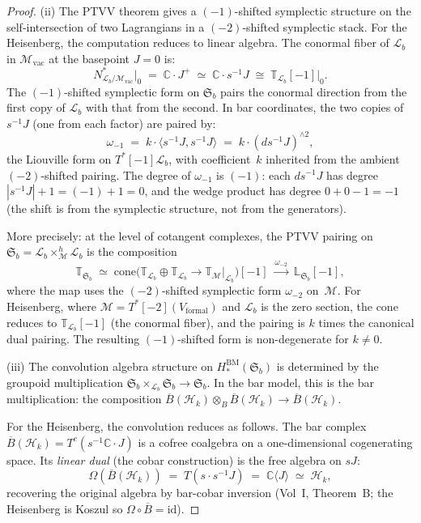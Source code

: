 \documentclass[11pt]{article}
\newcommand{\cM}{\mathcal{M}}
\newcommand{\cH}{\mathcal{H}}
\newcommand{\cL}{\mathcal{L}}
\newcommand{\barB}{\overline{B}}
\newcommand{\C}{\mathbb{C}}
\newcommand{\id}{\mathrm{id}}
\begin{document}
\begin{proof}
(ii)\enspace
The PTVV theorem gives a $(-1)$-shifted symplectic structure on the
self-intersection of two Lagrangians in a $(-2)$-shifted symplectic
stack.  For the Heisenberg, the computation reduces to linear
algebra.  The conormal fiber of $\cL_b$ in $\cM_{\mathrm{vac}}$ at
the basepoint $J = 0$ is:
\[
N^*_{\cL_b/\cM_{\mathrm{vac}}} \big|_0
\;=\;
\C \cdot J^+
\;\simeq\;
\C \cdot s^{-1}J
\;\cong\;
\mathbb{T}_{\cL_b}[-1]\big|_0.
\]
The $(-1)$-shifted symplectic form on $\mathfrak{S}_b$ pairs
the conormal direction from the first copy of $\cL_b$ with that
from the second.  In bar coordinates, the two copies of $s^{-1}J$
(one from each factor) are paired by:
\[
\omega_{-1}
\;=\;
k \cdot \langle s^{-1}J, s^{-1}J \rangle
\;=\;
k \cdot (ds^{-1}J)^{\wedge 2},
\]
the Liouville form on $T^*[-1]\cL_b$, with coefficient~$k$ inherited
from the ambient $(-2)$-shifted pairing.  The degree of
$\omega_{-1}$ is $(-1)$: each $ds^{-1}J$ has degree
$|s^{-1}J| + 1 = (-1) + 1 = 0$, and the wedge product has degree
$0 + 0 - 1 = -1$ (the shift is from the symplectic structure, not
from the generators).

More precisely: at the level of cotangent complexes, the
PTVV pairing on $\mathfrak{S}_b = \cL_b \times^h_\cM \cL_b$ is
the composition
\[
\mathbb{T}_{\mathfrak{S}_b}
\;\simeq\;
\mathrm{cone}\bigl(
  \mathbb{T}_{\cL_b} \oplus \mathbb{T}_{\cL_b}
  \to
  \mathbb{T}_\cM|_{\cL_b}
\bigr)[-1]
\;\xrightarrow{\omega_{-2}}\;
\mathbb{L}_{\mathfrak{S}_b}[-1],
\]
where the map uses the $(-2)$-shifted symplectic form $\omega_{-2}$
on~$\cM$.  For Heisenberg, where $\cM = T^*[-2](V_{\mathrm{formal}})$
and $\cL_b$ is the zero section, the cone reduces to
$\mathbb{T}_{\cL_b}[-1]$ (the conormal fiber), and the pairing is
$k$ times the canonical dual pairing.  The resulting $(-1)$-shifted
form is non-degenerate for $k \ne 0$.

(iii)\enspace
The convolution algebra structure on
$H_*^{\mathrm{BM}}(\mathfrak{S}_b)$ is determined by the groupoid
multiplication $\mathfrak{S}_b \times_{\cL_b} \mathfrak{S}_b \to
\mathfrak{S}_b$.  In the bar model, this is the bar multiplication:
the composition $\barB(\cH_k) \otimes_B \barB(\cH_k) \to
\barB(\cH_k)$.

For the Heisenberg, the convolution reduces as follows.  The
bar complex $\barB(\cH_k) = T^c(s^{-1}\C\cdot J)$ is a cofree
coalgebra on a one-dimensional cogenerating space.  Its
\emph{linear dual} (the cobar construction) is the free algebra on
$sJ$:
\[
\Omega(\barB(\cH_k))
\;=\;
T(s \cdot s^{-1}J)
\;=\;
\C\langle J \rangle
\;\simeq\;
\cH_k,
\]
recovering the original algebra by bar-cobar inversion (Vol~I,
Theorem~B; the Heisenberg is Koszul so $\Omega \circ \barB = \id$).


\end{proof}
\end{document}

